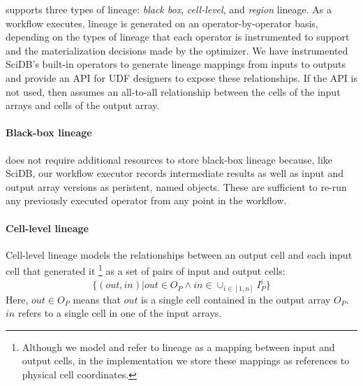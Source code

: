 
\sys{} supports three types of lineage: {\it black box},  {\it cell-level}, and {\it region}
lineage.
As a workflow executes, lineage is generated on an operator-by-operator basis,
depending on the types of lineage that each operator is instrumented to support
and the materialization decisions made by the optimizer.  We have instrumented
SciDB's built-in operators to generate lineage mappings from inputs to
outputs and provide an API for
UDF designers to expose these relationships.  If the API is not used, then \sys{}
assumes an all-to-all relationship between the cells of the input arrays and
cells of the output array.



\paragraph{Black-box lineage}\sys{} does not require additional resources to store black-box lineage because, like SciDB,
our workflow executor records intermediate results as well as input and output array versions
as peristent, named objects. These are sufficient to re-run any previously executed
operator from any point in the workflow.


\paragraph{Cell-level lineage} Cell-level lineage models the relationships
between an output cell and each input cell that generated it \footnote{Although
    we model and refer to lineage as a mapping between input and output cells,
    in the \sys{} implementation we store these mappings as references to
physical cell coordinates.} as a set of pairs of input and output cells:
{\footnotesize $$\{(out,in) | out \in O_P \wedge in \in \cup_{i\in [1,n]} I_P^i
\}$$ } Here, $out \in O_P$ means that $out$ is a single cell contained in the
output array $O_P$.  $in$ refers to a single cell in one of the input arrays.

